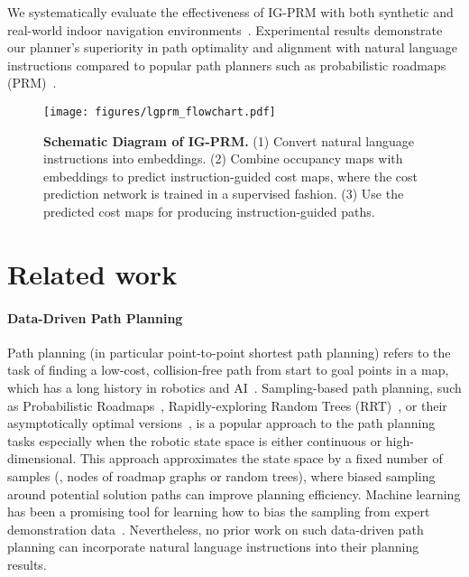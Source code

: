 We systematically evaluate the effectiveness of IG-PRM with both synthetic and real-world indoor navigation environments~\cite{xia2018gibson,dobrevski2020adaptive}. Experimental results demonstrate our planner's superiority in path optimality and alignment with natural language instructions compared to popular path planners such as probabilistic roadmaps (PRM)~\cite{kavraki1996probabilistic,karaman2011sampling}.


\begin{figure*}[t]
    \centering
    \texttt{[image: figures/lgprm\_flowchart.pdf]}
    \caption{\textbf{Schematic Diagram of IG-PRM.} (1) Convert natural language instructions into embeddings. (2) Combine occupancy maps with embeddings to predict instruction-guided cost maps, where the cost prediction network is trained in a supervised fashion. (3) Use the predicted cost maps for producing instruction-guided paths.}
    \label{fig:framework}
\end{figure*}


\section{Related work}
\paragraph{Data-Driven Path Planning}
Path planning (in particular point-to-point shortest path planning) refers to the task of finding a low-cost, collision-free path from start to goal points in a map, which has a long history in robotics and AI~\cite{hart1968formal,abd2015comprehensive,gonzalez2015review}. Sampling-based path planning, such as Probabilistic Roadmaps~\cite{kavraki1996probabilistic}, Rapidly-exploring Random Trees (RRT)~\cite{lavalle1998rapidly}, or their asymptotically optimal versions~\cite{karaman2011sampling}, is a popular approach to the path planning tasks especially when the robotic state space is either continuous or high-dimensional. This approach approximates the state space by a fixed number of samples (\ie, nodes of roadmap graphs or random trees), where biased sampling around potential solution paths can improve planning efficiency. Machine learning has been a promising tool for learning how to bias the sampling from expert demonstration data~\cite{ichter2018learning,chen2019learning,ichter2020learned}. Nevertheless, no prior work on such data-driven path planning can incorporate natural language instructions into their planning results.

